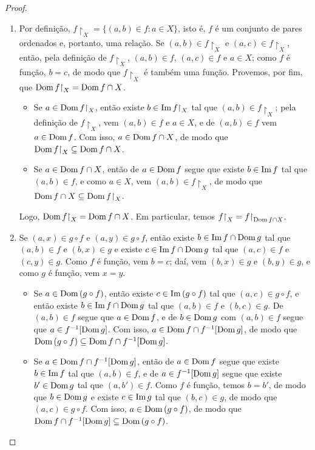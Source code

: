 \begin{proof}
    \leavevmode
        \begin{enumerate}[leftmargin=*, align=left, label=\textbf{(\alph*)}]
            \item Por definição, $f\restriction_X = \{ (a,b) \in f : a \in X \}$, isto é, $f$ é um conjunto de pares ordenados e, portanto, uma relação. Se $(a,b) \in f\restriction_X$ e $(a,c) \in f\restriction_X$, então, pela definição de $f\restriction_X$, $(a,b) \in f$, $(a,c) \in f$ e $a \in X$; como $f$ é função, $b=c$, de modo que $f\restriction_X$ é também uma função. Provemos, por fim, que $\Dom f\restriction_X =  \Dom f \cap X$.
                \begin{itemize}
                    \item[($\subseteq$)] Se $a \in \Dom f\restriction_X$, então existe $b \in \Img f\restriction_X$ tal que $(a,b) \in f\restriction_X$; pela definição de $f\restriction_X$, vem $(a,b) \in f$ e $a \in X$, e de $(a,b) \in f$ vem $a \in \operatorname{Dom} f$. Com isso, $a \in \operatorname{Dom} f \cap X$, de modo que $\Dom f\restriction_X \subseteq \Dom f \cap X$.
                    \item[($\supseteq$)] Se $a \in \operatorname{Dom} f \cap X$, então de $a \in \operatorname{Dom} f$ segue que existe $b \in \operatorname{Im} f$ tal que $(a,b) \in f$, e como $a \in X$, vem $(a,b) \in f\restriction_X$, de modo que $\Dom f \cap X \subseteq \Dom f\restriction_X$. 
                \end{itemize}
            Logo, $\Dom f\restriction_X = \Dom f \cap X$. Em particular, temos $f\restriction_X = f \restriction_{\Dom f \cap X}$. \blackproof
            \item Se $(a,x) \in g \circ f$ e $(a,y) \in g \circ f$, então existe $b \in \operatorname{Im} f \cap \operatorname{Dom} g$ tal que $(a,b) \in f$ e $(b,x) \in g$ e existe $c \in \operatorname{Im} f \cap \operatorname{Dom} g$ tal que $(a, c) \in f$ e $(c,y) \in g$. Como $f$ é função, vem $b=c$; daí, vem $(b,x) \in g$ e $(b,y) \in g$, e como $g$ é função, vem $x=y$.
                \begin{itemize}
                    \item[($\subseteq$)] Se $a \in \operatorname{Dom} \, (g \circ f)$, então existe $c \in \operatorname{Im} \, (g \circ f)$ tal que $(a,c) \in g \circ f$, e então existe $b \in \operatorname{Im} f \cap \operatorname{Dom} g$ tal que $(a,b) \in f$ e $(b,c) \in g$. De $(a,b) \in f$ segue que $a \in \operatorname{Dom} f$, e de $b \in \operatorname{Dom} g$ com $(a,b) \in f$ segue que $a \in f^{-1}[\operatorname{Dom} g]$. Com isso, $a \in \operatorname{Dom} f \cap f^{-1}[\operatorname{Dom} g]$, de modo que $\operatorname{Dom} \, (g \circ f) \subseteq \operatorname{Dom} f \cap f^{-1}[\operatorname{Dom} g]$.
                    \item[($\supseteq$)] Se $a \in \operatorname{Dom} f \cap f^{-1}[\operatorname{Dom} g]$, então de $a \in \operatorname{Dom} f$ segue que existe $b \in \operatorname{Im} f$ tal que $(a,b) \in f$, e de $a \in f^{-1}[\operatorname{Dom} g]$ segue que existe $b' \in \operatorname{Dom} g$ tal que $(a,b') \in f$. Como $f$ é função, temos $b = b'$, de modo que $b \in \operatorname{Dom} g$ e existe $c \in \operatorname{Im} g$ tal que $(b,c) \in g$, de modo que $(a,c) \in g \circ f$. Com isso, $a \in \operatorname{Dom} \, (g \circ f)$, de modo que $\operatorname{Dom} f \cap f^{-1}[\operatorname{Dom} g] \subseteq \operatorname{Dom} \, (g \circ f)$.  

\end{itemize}
\end{enumerate}
\end{proof}
